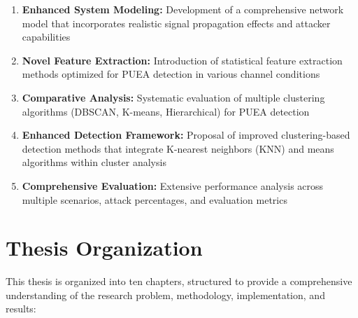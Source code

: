 \begin{enumerate}
\item \textbf{Enhanced System Modeling:} Development of a comprehensive network model that incorporates realistic signal propagation effects and attacker capabilities

\item \textbf{Novel Feature Extraction:} Introduction of statistical feature extraction methods optimized for PUEA detection in various channel conditions

\item \textbf{Comparative Analysis:} Systematic evaluation of multiple clustering algorithms (DBSCAN, K-means, Hierarchical) for PUEA detection

\item \textbf{Enhanced Detection Framework:} Proposal of improved clustering-based detection methods that integrate K-nearest neighbors (KNN) and means algorithms within cluster analysis

\item \textbf{Comprehensive Evaluation:} Extensive performance analysis across multiple scenarios, attack percentages, and evaluation metrics
\end{enumerate}

\section{Thesis Organization}
This thesis is organized into ten chapters, structured to provide a comprehensive understanding of the research problem, methodology, implementation, and results:

